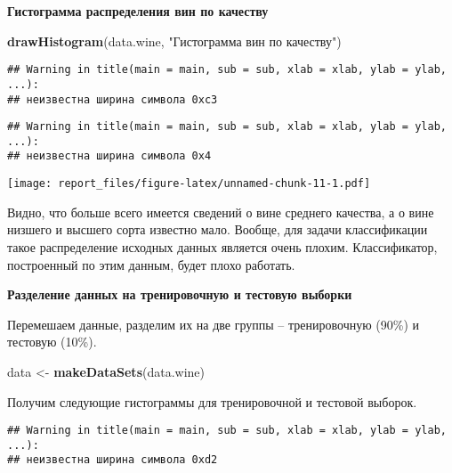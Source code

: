 \documentclass[
]{article}
\newenvironment{Shaded}{\begin{snugshade}}{\end{snugshade}}
\newcommand{\KeywordTok}[1]{\textcolor[rgb]{0.13,0.29,0.53}{\textbf{#1}}}
\newcommand{\NormalTok}[1]{#1}
\newcommand{\OperatorTok}[1]{\textcolor[rgb]{0.81,0.36,0.00}{\textbf{#1}}}
\newcommand{\StringTok}[1]{\textcolor[rgb]{0.31,0.60,0.02}{#1}}
\begin{document}
\textbf{Гистограмма распределения вин по качеству}

\begin{Shaded}
\begin{Highlighting}[]
\KeywordTok{drawHistogram}\NormalTok{(data.wine, }\StringTok{"Гистограмма вин по качеству"}\NormalTok{)}
\end{Highlighting}
\end{Shaded}

\begin{verbatim}
## Warning in title(main = main, sub = sub, xlab = xlab, ylab = ylab, ...):
## неизвестна ширина символа 0xc3
\end{verbatim}

\begin{verbatim}
## Warning in title(main = main, sub = sub, xlab = xlab, ylab = ylab, ...):
## неизвестна ширина символа 0x4
\end{verbatim}

\texttt{[image: report\_files/figure-latex/unnamed-chunk-11-1.pdf]}

Видно, что больше всего имеется сведений о вине среднего качества, а о
вине низшего и высшего сорта известно мало. Вообще, для задачи
классификации такое распределение исходных данных является очень плохим.
Классификатор, построенный по этим данным, будет плохо работать.

\textbf{Разделение данных на тренировочную и тестовую выборки}

Перемешаем данные, разделим их на две группы -- тренировочную (90\%) и
тестовую (10\%).

\begin{Shaded}
\begin{Highlighting}[]
\NormalTok{data <-}\StringTok{ }\KeywordTok{makeDataSets}\NormalTok{(data.wine)}
\end{Highlighting}
\end{Shaded}

Получим следующие гистограммы для тренировочной и тестовой выборок.

\begin{Shaded}
\end{Shaded}

\begin{verbatim}
## Warning in title(main = main, sub = sub, xlab = xlab, ylab = ylab, ...):
## неизвестна ширина символа 0xd2
\end{verbatim}
\end{document}
